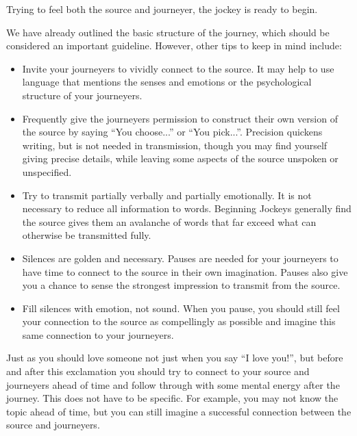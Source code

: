 \documentclass[12pt]{book}
\begin{document}
Trying to feel both the source and journeyer, the jockey is ready to begin.
					
We have already outlined the basic structure of the journey, which should be considered an important guideline. However, other tips to keep in mind include:
					

	\begin{itemize}
\item 

Invite your journeyers to vividly connect to the source. It may help to use language that mentions the senses and emotions or the psychological structure of your journeyers.
						
						 					\item 		
Frequently give the journeyers permission to construct their own version of the source by saying “You choose...” or “You pick...”. Precision quickens writing, but is not needed in transmission, though you may find yourself giving precise details, while leaving some aspects of the source unspoken or unspecified.
						
						 					\item 		
Try to transmit partially verbally and partially emotionally. It is not necessary to reduce all information to words. Beginning Jockeys  generally find the source gives them an avalanche of words that far exceed what can otherwise  be transmitted fully.
						
						 					\item 		
Silences are golden and necessary. Pauses are needed for your journeyers to have time to connect to the source in their own imagination.
Pauses also give you a chance to sense the strongest impression to transmit from the source.

\item 
Fill silences with emotion, not sound. When you pause, you should still feel your connection to the source as compellingly as possible and imagine this same connection to your journeyers.
\end{itemize}
  
					
Just as you should love someone not just when you say “I love you!”, but before and after this exclamation you should try to connect to your source and journeyers ahead of time and follow through with some mental energy after the journey. This does not have to be specific. For example, you may not know the topic ahead of time, but you can still imagine a successful connection between the source and journeyers.
					
\end{document}
